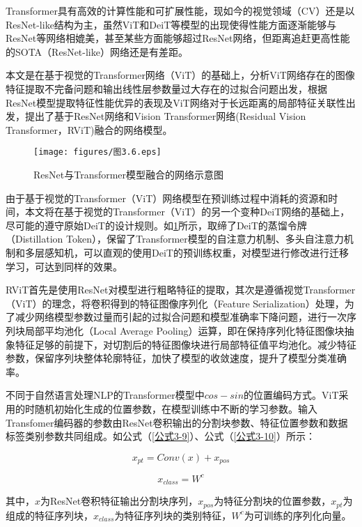 Transformer具有高效的计算性能和可扩展性能，现如今的视觉领域（CV）还是以ResNet-like结构为主，虽然ViT和DeiT等模型的出现使得性能方面逐渐能够与ResNet等网络相媲美，甚至某些方面能够超过ResNet网络，但距离追赶更高性能的SOTA（ResNet-like）网络还是有差距。

本文是在基于视觉的Transformer网络（ViT）的基础上，分析ViT网络存在的图像特征提取不完备问题和输出线性层参数量过大存在的过拟合问题出发，根据ResNet模型提取特征性能优异的表现及ViT网络对于长远距离的局部特征关联性出发，提出了基于ResNet网络和Vision Transformer网络(Residual Vision Transformer，RViT)融合的网络模型。

\begin{figure}[!ht]
	\centering
	\texttt{[image: figures/图3.6.eps]}
	\caption{ResNet与Transformer模型融合的网络示意图}\label{图3.6}
\end{figure}

由于基于视觉的Transformer（ViT）网络模型在预训练过程中消耗的资源和时间，本文将在基于视觉的Transformer（ViT）的另一个变种DeiT网络的基础上，尽可能的遵守原始DeiT的设计规则。如\ref{图3.6}所示，取缔了DeiT的蒸馏令牌（Distillation Token），保留了Transformer模型的自注意力机制、多头自注意力机制和多层感知机，可以直观的使用DeiT的预训练权重，对模型进行修改进行迁移学习，可达到同样的效果。

RViT首先是使用ResNet对模型进行粗略特征的提取，其次是遵循视觉Transformer（ViT）的理念，将卷积得到的特征图像序列化（Feature Serialization）处理，为了减少网络模型参数过量而引起的过拟合问题和模型准确率下降问题，进行一次序列块局部平均池化（Local Average Pooling）运算，即在保持序列化特征图像块抽象特征足够的前提下，对切割后的特征图像块进行局部特征值平均池化。减少特征参数，保留序列块整体轮廓特征，加快了模型的收敛速度，提升了模型分类准确率。


不同于自然语言处理NLP的Transformer模型中$cos-sin$的位置编码方式。ViT采用的时随机初始化生成的位置参数，在模型训练中不断的学习参数。输入Transfomer编码器的参数由ResNet卷积输出的分割块参数、特征位置参数和数据标签类别参数共同组成。如公式（\ref{公式3-9}）、公式（\ref{公式3-10}）所示：

\begin{equation}\label{公式3-9}
	x_{pt}=Conv\left(x\right)+x_{pos}
\end{equation}

\begin{equation}\label{公式3-10}
	x_{class}=W^c                         
\end{equation}

其中，$x$为ResNet卷积特征输出分割块序列，$x_{pos}$为特征分割块的位置参数，$x_{pt}$为组成的特征序列块，$x_{class}$为特征序列块的类别特征，$W^c$为可训练的序列化向量。


